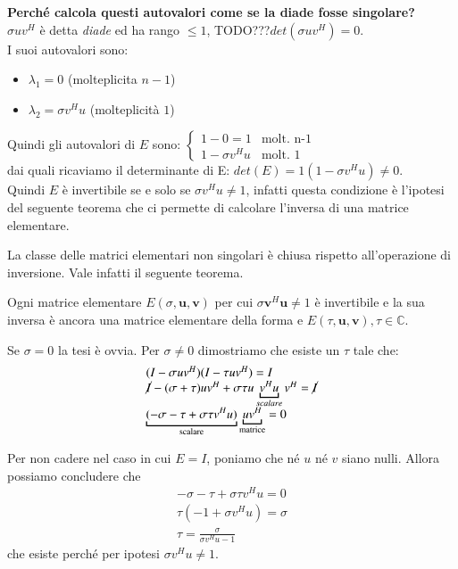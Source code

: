 \begin{notes}\textbf{Perch\'e calcola questi autovalori come se la diade fosse singolare?}\\
  $\sigma u v^{H}$ \`e detta \emph{diade} ed ha rango $\leq 1$,
  TODO???$det(\sigma u v^{H}) = 0$.\\
I suoi autovalori sono:
\begin{itemize}
\item $\lambda_1 = 0$  (molteplicita $n-1$)
\item $\lambda_2 = \sigma v^{H} u$   (molteplicit\`a $1$)
\end{itemize}

Quindi gli autovalori di $E$ sono:
$\left\{ 
 \begin{array}{ll}
 1-0 = 1            & \text{molt. n-1} \\
 1 - \sigma v^{H} u & \text{molt. 1}
\end{array}
\right.$\\
dai quali ricaviamo il determinante di E: $det(E) = 1 (1 - \sigma v^H
u) \neq 0$.\\
Quindi $E$ \`e invertibile se e solo se $\sigma v^{H}u \neq 1$, infatti
questa condizione \`e l'ipotesi del seguente teorema che ci permette di
calcolare l'inversa di una matrice elementare.
\end{notes}

La classe delle matrici elementari non singolari \`e chiusa rispetto
all'operazione di inversione. Vale infatti il seguente teorema.

\begin{theo}
\label{th:eleminversa}
  Ogni matrice elementare $E(\sigma, \mathbf{u, v})$ per cui $\sigma
  \mathbf{v}^H \mathbf{u} \neq 1$ \`e invertibile e la sua inversa \`e
  ancora una matrice elementare della forma e $E(\tau, \mathbf{u, v}),
  \tau \in \mathbb{C}$.
\end{theo}

\begin{thproof}
Se $\sigma=0$ la tesi \`e ovvia. Per $\sigma \neq 0$ dimostriamo che
esiste un $\tau$ tale che:
\[\begin{array}{ll}
 (I - \sigma uv^{H})(I - \tau u v^{H}) = I \\
 \cancel{I} - (\sigma + \tau) uv^{H} + \sigma \tau u 
 \underbracket{v^{H} u}_{scalare} v^{H} = \cancel{I} \\
 \underbracket{(-\sigma - \tau +  \sigma \tau v^{H}
   u)}_{\text{scalare}} \underbracket{uv^{H}}_{\text{matrice}} = 0 
\end{array}\]

Per non cadere nel caso in cui $E=I$, poniamo che n\'e $u$ n\'e $v$ siano
nulli. Allora possiamo concludere che
\[\begin{array}{ll}
 - \sigma - \tau + \sigma\tau v^{H} u = 0 \\
 \tau(-1 + \sigma v^{H}u) = \sigma \\
 \tau = \frac{\sigma}{\sigma v^{H}u-1} 
\end{array}\]
che esiste perch\'e per ipotesi $\sigma v^{H}u \neq 1$.
\end{thproof}

